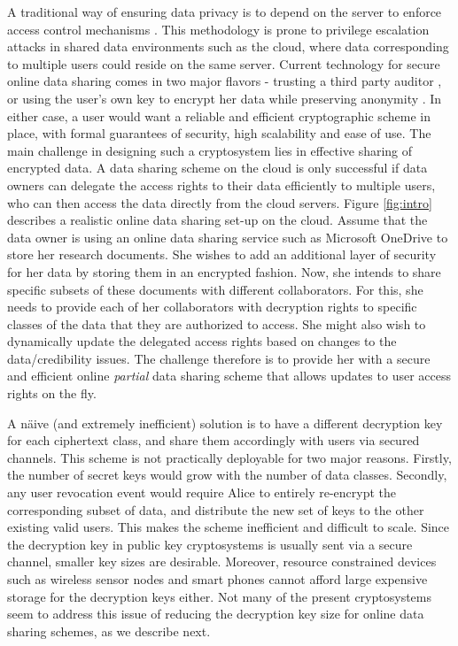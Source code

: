 A traditional way of ensuring data privacy is to depend on the server to enforce access control mechanisms \cite{chow2012spice}. This methodology is prone to privilege escalation attacks in shared data environments such as the cloud, where data corresponding to multiple users could reside on the same server. Current technology for secure online data sharing comes in two major flavors - trusting a third party auditor \cite{cryptoeprint:2009:579}, or using the user's own key to encrypt her data while preserving anonymity \cite{chow2012dynamic}. In either case, a user would want a reliable and efficient cryptographic scheme in place, with formal guarantees of security, high scalability and ease of use. The main challenge in designing such a cryptosystem lies in effective sharing of encrypted data. A data sharing scheme on the cloud is only successful if data owners can delegate the access rights to their data efficiently to multiple users, who can then access the data directly from the cloud servers. Figure \ref{fig:intro} describes a realistic online data sharing set-up on the cloud. Assume that the data owner is using an online data sharing service such as Microsoft OneDrive \cite{shallman2014up} to store her research documents. She wishes to add an additional layer of security for her data by storing them in an encrypted fashion. Now, she intends to share specific subsets of these documents with different collaborators. For this, she needs to provide each of her collaborators with decryption rights to specific classes of the data that they are authorized to access. She might also wish to dynamically update the delegated access rights based on changes to the data/credibility issues. The challenge therefore is to provide her with a secure and efficient online \emph{partial} data sharing scheme that allows updates to user access rights on the fly.

A n\"{a}ive (and extremely inefficient) solution is to have a different decryption key for each ciphertext class, and share them accordingly with users via secured channels. This scheme is not practically deployable for two major reasons. Firstly, the number of secret keys would grow with the number of data classes. Secondly, any user revocation event would require Alice to entirely re-encrypt the corresponding subset of data, and distribute the new set of keys to the other existing valid users. This makes the scheme inefficient and difficult to scale. Since the decryption key in public key cryptosystems is usually sent via a secure channel, smaller key sizes are desirable. Moreover, resource constrained devices such as wireless sensor nodes and smart phones cannot afford large expensive storage for the decryption keys either. Not many of the present cryptosystems seem to address this issue of reducing the decryption key size for online data sharing schemes, as we describe next.


